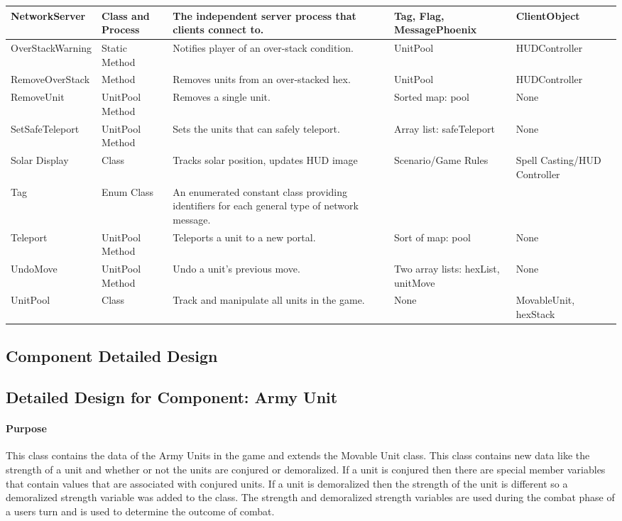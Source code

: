 \documentclass[12pt,a4paper,titlepage]{article}
\begin{document}
{\begin{center}
\begin{tabularx}{\linewidth}{|p{1.5in}|X|X|X|X|}
\hline
NetworkServer & Class and Process & The independent server process that clients connect to. & Tag, Flag, MessagePhoenix & ClientObject\\
\hline
OverStackWarning & Static Method & Notifies player of an over-stack condition. & UnitPool & HUDController\\
\hline
RemoveOverStack & Method & Removes units from an over-stacked hex. & UnitPool & HUDController\\
\hline
RemoveUnit & UnitPool Method & Removes a single unit. & Sorted map: pool & None\\
\hline
SetSafeTeleport & UnitPool Method & Sets the units that can safely teleport. & Array list: safeTeleport & None\\
\hline
Solar Display & Class & Tracks solar position, updates HUD image & Scenario/Game Rules & Spell Casting/HUD Controller\\
\hline
Tag & Enum Class & An enumerated constant class providing identifiers for each general type of network message. & & \\
\hline
Teleport & UnitPool Method & Teleports a unit to a new portal. & Sort of map: pool & None\\
\hline 
UndoMove & UnitPool Method & Undo a unit's previous move. & Two array lists: hexList, unitMove & None\\
\hline
UnitPool & Class & Track and manipulate all units in the game. & None & MovableUnit, hexStack\\
\hline
\end{tabularx}
\end{center}
}

\subsection{Component Detailed Design}
\subsection{Detailed Design for Component: Army Unit}
\paragraph{Purpose} This class contains the data of the Army Units in the game and extends the Movable Unit class. This class contains new data like the strength of a unit and whether or not the units are conjured or demoralized. If a unit is conjured then there are special member variables that contain values that are associated with conjured units. If a unit is demoralized then the strength of the unit is different so a demoralized strength variable was added to the class. The strength and demoralized strength variables are used during the combat phase of a users turn and is used to determine the outcome of combat. 
\end{document}
